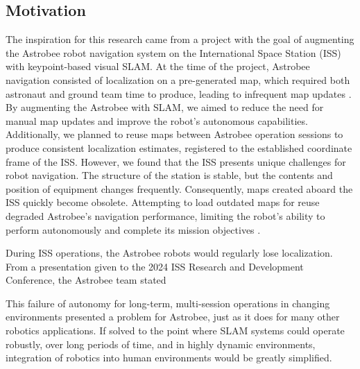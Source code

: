 \subsection{Motivation}


The inspiration for this research came from a project with the goal of augmenting the Astrobee robot navigation system on the International Space Station (ISS) with keypoint-based visual SLAM. At the time of the project, Astrobee navigation consisted of localization on a pre-generated map, which required both astronaut and ground team time to produce, leading to infrequent map updates \cite{soussanAstroLocEfficientRobust2022}. By augmenting the Astrobee with SLAM, we aimed to reduce the need for manual map updates and improve the robot's autonomous capabilities. Additionally, we planned to reuse maps between Astrobee operation sessions to produce consistent localization estimates, registered to the established coordinate frame of the ISS. However, we found that the ISS presents unique challenges for robot navigation. The structure of the station is stable, but the contents and position of equipment changes frequently. Consequently, maps created aboard the ISS quickly become obsolete. Attempting to load outdated maps for reuse degraded Astrobee's navigation performance, limiting the robot's ability to perform autonomously and complete its mission objectives \cite{zuralesCollaborativeSensingMapping2024}.


During ISS operations, the Astrobee robots would regularly lose localization. From a presentation given to the 2024 ISS Research and Development Conference, the Astrobee team stated



This failure of autonomy for long-term, multi-session operations in changing environments presented a problem for Astrobee, just as it does for many other robotics applications. If solved to the point where SLAM systems could operate robustly, over long periods of time, and in highly dynamic environments, integration of robotics into human environments would be greatly simplified.